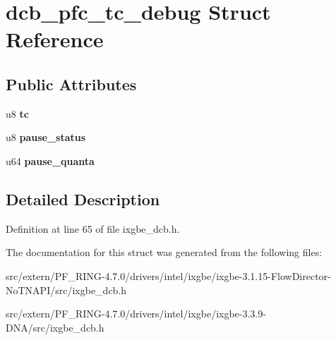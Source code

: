 \hypertarget{structdcb__pfc__tc__debug}{
\section{dcb\_\-pfc\_\-tc\_\-debug Struct Reference}
\label{structdcb__pfc__tc__debug}
}
\subsection*{Public Attributes}
\begin{DoxyCompactItemize}
\item 
\hypertarget{structdcb__pfc__tc__debug_a627f55b6349ed46342601d45c846ba3d}{
u8 {\bfseries tc}}
\label{structdcb__pfc__tc__debug_a627f55b6349ed46342601d45c846ba3d}

\item 
\hypertarget{structdcb__pfc__tc__debug_a7b82f45220fee32cdd216acd9175ce16}{
u8 {\bfseries pause\_\-status}}
\label{structdcb__pfc__tc__debug_a7b82f45220fee32cdd216acd9175ce16}

\item 
\hypertarget{structdcb__pfc__tc__debug_a38ed84ac7c50237228384b2df2b33f40}{
u64 {\bfseries pause\_\-quanta}}
\label{structdcb__pfc__tc__debug_a38ed84ac7c50237228384b2df2b33f40}

\end{DoxyCompactItemize}


\subsection{Detailed Description}


Definition at line 65 of file ixgbe\_\-dcb.h.



The documentation for this struct was generated from the following files:\begin{DoxyCompactItemize}
\item 
src/extern/PF\_\-RING-\/4.7.0/drivers/intel/ixgbe/ixgbe-\/3.1.15-\/FlowDirector-\/NoTNAPI/src/ixgbe\_\-dcb.h\item 
src/extern/PF\_\-RING-\/4.7.0/drivers/intel/ixgbe/ixgbe-\/3.3.9-\/DNA/src/ixgbe\_\-dcb.h\end{DoxyCompactItemize}
